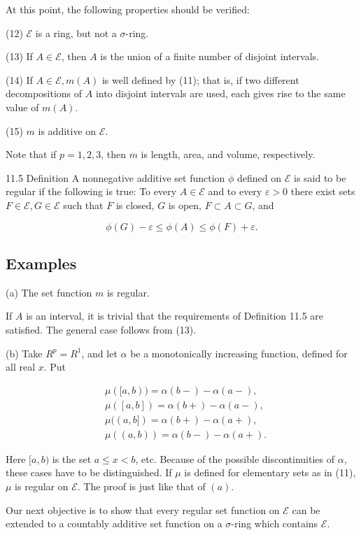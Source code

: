 \documentclass[10pt]{article}
\begin{document}
At this point, the following properties should be verified:

(12) $\mathscr{E}$ is a ring, but not a $\sigma$-ring.

(13) If $A \in \mathscr{E}$, then $A$ is the union of a finite number of disjoint intervals.

(14) If $A \in \mathscr{E}, m(A)$ is well defined by (11); that is, if two different decompositions of $A$ into disjoint intervals are used, each gives rise to the same value of $m(A)$.

(15) $m$ is additive on $\mathscr{E}$.

Note that if $p=1,2,3$, then $m$ is length, area, and volume, respectively.

11.5 Definition A nonnegative additive set function $\phi$ defined on $\mathscr{E}$ is said to be regular if the following is true: To every $A \in \mathscr{E}$ and to every $\varepsilon>0$ there exist sets $F \in \mathscr{E}, G \in \mathscr{E}$ such that $F$ is closed, $G$ is open, $F \subset A \subset G$, and

$$
\phi(G)-\varepsilon \leq \phi(A) \leq \phi(F)+\varepsilon .
$$

\subsection{Examples}
(a) The set function $m$ is regular.

If $A$ is an interval, it is trivial that the requirements of Definition 11.5 are satisfied. The general case follows from (13).

(b) Take $R^{p}=R^{1}$, and let $\alpha$ be a monotonically increasing function, defined for all real $x$. Put

$$
\begin{aligned}
& \mu([a, b))=\alpha(b-)-\alpha(a-), \\
& \mu([a, b])=\alpha(b+)-\alpha(a-), \\
& \mu((a, b])=\alpha(b+)-\alpha(a+), \\
& \mu((a, b))=\alpha(b-)-\alpha(a+) .
\end{aligned}
$$

Here $[a, b)$ is the set $a \leq x<b$, etc. Because of the possible discontinuities of $\alpha$, these cases have to be distinguished. If $\mu$ is defined for elementary sets as in (11), $\mu$ is regular on $\mathscr{E}$. The proof is just like that of $(a)$.

Our next objective is to show that every regular set function on $\mathscr{E}$ can be extended to a countably additive set function on a $\sigma$-ring which contains $\mathscr{E}$.
\end{document}
